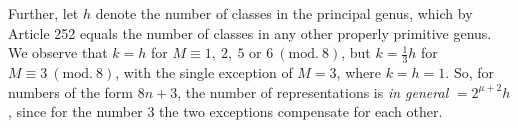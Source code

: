 Further, let $h$ denote the number of classes in the principal
genus, which by Article 252 equals the number of classes in any other
properly primitive genus. We observe that $k=h$ for $M\equiv1,\allowbreak \ 2,\allowbreak \ 5\text{ or }6\ (\mathrm{mod.}\ 8)$, but
$k=\tfrac{1}{3}h$ for $M\equiv3\ (\mathrm{mod.}\ 8)$, with the single exception of $M=3$, where
$k=h=1$. So, for numbers of the form $8n+3$, the number of representations
is \textit{in general} $=2^{\mu+2}h$, since for the number $3$ the two
exceptions compensate for each other.

